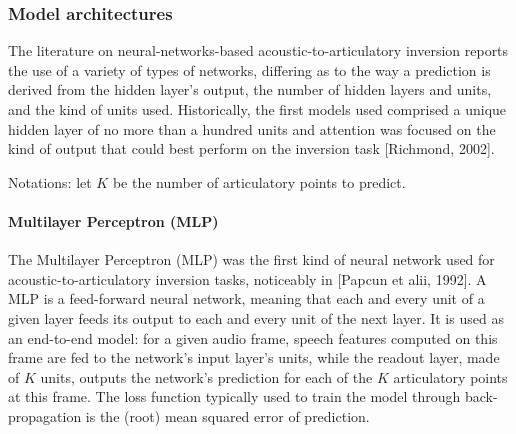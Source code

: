 \subsubsection{Model architectures}

The literature on neural-networks-based acoustic-to-articulatory inversion reports the use of a variety of types of networks, differing as to the way a prediction is derived from the hidden layer's output, the number of hidden layers and units, and the kind of units used. Historically, the first models used comprised a unique hidden layer of no more than a hundred units and attention was focused on the kind of output that could best perform on the inversion task [Richmond, 2002].



Notations: let $K$ be the number of articulatory points to predict. %

\paragraph{Multilayer Perceptron (MLP)}

The Multilayer Perceptron (MLP) was the first kind of neural network used for acoustic-to-articulatory inversion tasks, noticeably in [Papcun et alii, 1992]. A MLP is a feed-forward neural network, meaning that each and every unit of a given layer feeds its output to each and every unit of the next layer. It is used as an end-to-end model: for a given audio frame, speech features computed on this frame are fed to the network's input layer's units, while the readout layer, made of $K$ units, outputs the network's prediction for each of the $K$ articulatory points at this frame. The loss function typically used to train the model through back-propagation is the (root) mean squared error of prediction.\\

